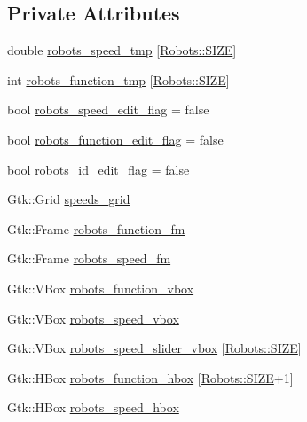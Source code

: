 \subsection*{Private Attributes}
\begin{DoxyCompactItemize}
\item 
double \hyperlink{class_robot_g_u_i_ae952e428401558e2c81d1c3ed8ecb7e2}{robots\+\_\+speed\+\_\+tmp} \mbox{[}\hyperlink{class_robots_ae9df2f1d345ad6740f0459956cdd4712}{Robots\+::\+S\+I\+ZE}\mbox{]}
\item 
int \hyperlink{class_robot_g_u_i_a97cc6ff736a025294efe4e41d38164d3}{robots\+\_\+function\+\_\+tmp} \mbox{[}\hyperlink{class_robots_ae9df2f1d345ad6740f0459956cdd4712}{Robots\+::\+S\+I\+ZE}\mbox{]}
\item 
bool \hyperlink{class_robot_g_u_i_a0da216285bd7ded79b85328191d0354d}{robots\+\_\+speed\+\_\+edit\+\_\+flag} = false
\item 
bool \hyperlink{class_robot_g_u_i_afac83e97ea43120de2433cbe27413581}{robots\+\_\+function\+\_\+edit\+\_\+flag} = false
\item 
bool \hyperlink{class_robot_g_u_i_a27cecf0c25aaf4ad01c712945008d4de}{robots\+\_\+id\+\_\+edit\+\_\+flag} = false
\item 
Gtk\+::\+Grid \hyperlink{class_robot_g_u_i_a630a21b85d6a9583f77d0a97a2be66e4}{speeds\+\_\+grid}
\item 
Gtk\+::\+Frame \hyperlink{class_robot_g_u_i_af29bd5e935aaf337c5e2afaa4dd2119a}{robots\+\_\+function\+\_\+fm}
\item 
Gtk\+::\+Frame \hyperlink{class_robot_g_u_i_a13eebe1d64530f8cb3454f78589bb4ce}{robots\+\_\+speed\+\_\+fm}
\item 
Gtk\+::\+V\+Box \hyperlink{class_robot_g_u_i_a6d09ae30b925d6efd7c16e20b21c1781}{robots\+\_\+function\+\_\+vbox}
\item 
Gtk\+::\+V\+Box \hyperlink{class_robot_g_u_i_a51bc5745e08692bd88195e623b5eb74a}{robots\+\_\+speed\+\_\+vbox}
\item 
Gtk\+::\+V\+Box \hyperlink{class_robot_g_u_i_a0e88bd14baea3275ab923b4cb5fab40d}{robots\+\_\+speed\+\_\+slider\+\_\+vbox} \mbox{[}\hyperlink{class_robots_ae9df2f1d345ad6740f0459956cdd4712}{Robots\+::\+S\+I\+ZE}\mbox{]}
\item 
Gtk\+::\+H\+Box \hyperlink{class_robot_g_u_i_aba8f9fd9d3cfea4e5b4fe262ac6e3c0b}{robots\+\_\+function\+\_\+hbox} \mbox{[}\hyperlink{class_robots_ae9df2f1d345ad6740f0459956cdd4712}{Robots\+::\+S\+I\+ZE}+1\mbox{]}
\item 
Gtk\+::\+H\+Box \hyperlink{class_robot_g_u_i_a6723822512ce408ab5c3f4c27d335363}{robots\+\_\+speed\+\_\+hbox}

\end{DoxyCompactItemize}
